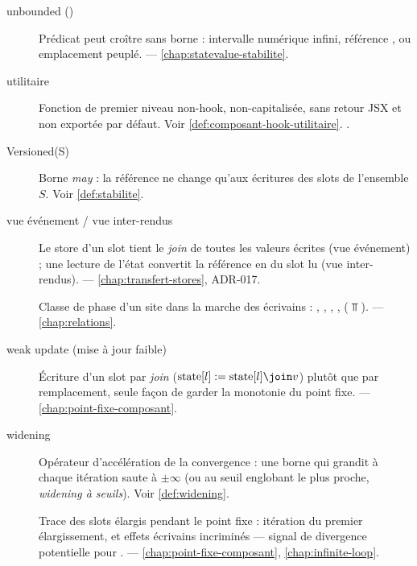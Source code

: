 \begin{description}
\item[unbounded ()] Prédicat \og peut croître sans borne\fg{} : intervalle numérique infini, référence , ou emplacement  peuplé.  — \cref{chap:statevalue-stabilite}.

\item[utilitaire] Fonction de premier niveau non-hook, non-capitalisée, sans retour JSX et non exportée par défaut. Voir \cref{def:composant-hook-utilitaire}. .

\item[Versioned(S)] Borne \emph{may} : la référence ne change qu'aux écritures des slots de l'ensemble \(S\). Voir \cref{def:stabilite}.

\item[vue événement / vue inter-rendus] Le store d'un slot tient le \emph{join} de toutes les valeurs écrites (vue événement) ; une lecture de l'état convertit la référence en  du slot lu (vue inter-rendus).  — \cref{chap:transfert-stores}, ADR-017.

\item[] Classe de phase d'un site dans la marche des écrivains : , , , ,  (\(\Top\)).  — \cref{chap:relations}.

\item[weak update (mise à jour faible)] Écriture d'un slot par \emph{join} (\(\text{state}[l] \mathrel{:=} \text{state}[l] \join v\)) plutôt que par remplacement, seule façon de garder la monotonie du point fixe.  — \cref{chap:point-fixe-composant}.

\item[widening] Opérateur d'accélération de la convergence : une borne qui grandit à chaque itération saute à \(\pm\infty\) (ou au seuil englobant le plus proche, \emph{widening à seuils}). Voir \cref{def:widening}.

\item[] Trace des slots élargis pendant le point fixe : itération du premier élargissement, et effets \og écrivains\fg{} incriminés — signal de divergence potentielle pour .  — \cref{chap:point-fixe-composant}, \cref{chap:infinite-loop}.


\end{description}
